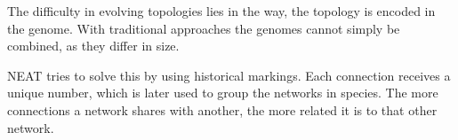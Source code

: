 The difficulty in evolving topologies lies in the way, the topology is encoded in the genome. With traditional approaches the genomes cannot simply be combined, as they differ in size.

NEAT tries to solve this by using historical markings. Each connection receives a unique number, which is later used to group the networks in species. The more connections a network shares with another, the more related it is to that other network.
